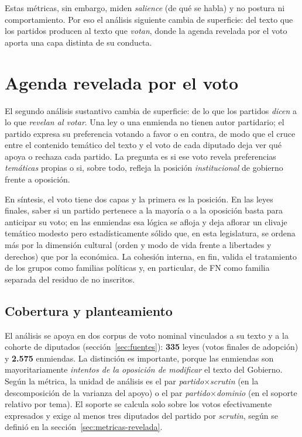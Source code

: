 Estas métricas, sin embargo, miden \emph{salience} (de qué se habla) y no
postura ni comportamiento. Por eso el análisis siguiente cambia de superficie:
del texto que los partidos producen al texto que \emph{votan}, donde la agenda
revelada por el voto aporta una capa distinta de su conducta.

\section{Agenda revelada por el voto}
\label{sec:res-revelada}

El segundo análisis sustantivo cambia de superficie: de lo que los partidos
\emph{dicen} a lo que \emph{revelan al votar}. Una ley o una enmienda no tienen
autor partidario; el partido expresa su preferencia votando a favor o en contra,
de modo que el cruce entre el contenido temático del texto y el voto de cada
diputado deja ver qué apoya o rechaza cada partido. La pregunta es si ese voto
revela preferencias \emph{temáticas} propias o si, sobre todo, refleja la
posición \emph{institucional} de gobierno frente a oposición.

En síntesis, el voto tiene dos capas y la primera es la posición. En las leyes
finales, saber si un partido pertenece a la mayoría o a la oposición basta para
anticipar su voto; en las enmiendas esa lógica se afloja y deja aflorar un
clivaje temático modesto pero estadísticamente sólido que, en esta legislatura,
se ordena más por la dimensión cultural (orden y modo de vida frente a
libertades y derechos) que por la económica. La cohesión interna, en fin, valida
el tratamiento de los grupos como familias políticas y, en particular, de FN
como familia separada del residuo de no inscritos.

\subsection{Cobertura y planteamiento}
\label{sec:res-revelada-cobertura}

El análisis se apoya en dos corpus de voto nominal vinculados a su texto y a la
cohorte de diputados (sección~\ref{sec:fuentes}): \textbf{335} leyes (votos
finales de adopción) y \textbf{2.575} enmiendas. La distinción es importante,
porque las enmiendas son mayoritariamente \emph{intentos de la oposición de
modificar} el texto del Gobierno. Según la métrica, la unidad de análisis es el
par \emph{partido$\times$scrutin} (en la descomposición de la varianza del apoyo)
o el par \emph{partido$\times$dominio} (en el soporte relativo por tema). El
soporte se calcula solo sobre los votos efectivamente expresados y exige al menos
tres diputados del partido por \emph{scrutin}, según se definió en la
sección~\ref{sec:metricas-revelada}.

